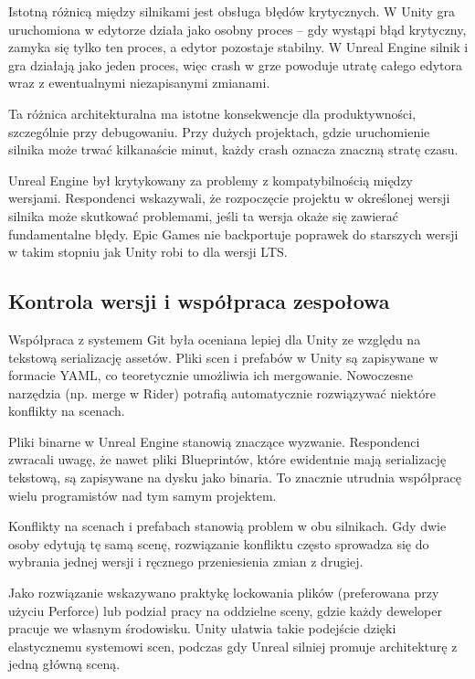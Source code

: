 Istotną różnicą między silnikami jest obsługa błędów krytycznych. W Unity gra uruchomiona w edytorze działa jako osobny proces -- gdy wystąpi błąd krytyczny, zamyka się tylko ten proces, a edytor pozostaje stabilny. W Unreal Engine silnik i gra działają jako jeden proces, więc crash w grze powoduje utratę całego edytora wraz z ewentualnymi niezapisanymi zmianami.

Ta różnica architekturalna ma istotne konsekwencje dla produktywności,
szczególnie przy debugowaniu. Przy dużych projektach, gdzie uruchomienie
silnika może trwać kilkanaście minut, każdy crash oznacza znaczną stratę czasu.


Unreal Engine był krytykowany za problemy z kompatybilnością między wersjami. Respondenci wskazywali, że rozpoczęcie projektu w określonej wersji silnika może skutkować problemami, jeśli ta wersja okaże się zawierać fundamentalne błędy. Epic Games nie backportuje poprawek do starszych wersji w takim stopniu jak Unity robi to dla wersji LTS.

\subsection{Kontrola wersji i współpraca zespołowa}
\label{subsec:kontrola-wersji}


Współpraca z systemem Git była oceniana lepiej dla Unity ze względu na tekstową serializację assetów. Pliki scen i prefabów w Unity są zapisywane w formacie YAML, co teoretycznie umożliwia ich mergowanie. Nowoczesne narzędzia (np. merge w Rider) potrafią automatycznie rozwiązywać niektóre konflikty na scenach.

Pliki binarne w Unreal Engine stanowią znaczące wyzwanie. Respondenci
zwracali uwagę, że nawet pliki Blueprintów, które ewidentnie mają serializację
tekstową, są zapisywane na dysku jako binaria. To znacznie utrudnia współpracę wielu programistów nad tym samym projektem.


Konflikty na scenach i prefabach stanowią problem w obu silnikach. Gdy dwie osoby edytują tę samą scenę, rozwiązanie konfliktu często sprowadza się do wybrania jednej wersji i ręcznego przeniesienia zmian z drugiej.

Jako rozwiązanie wskazywano praktykę lockowania plików (preferowana przy użyciu Perforce) lub podział pracy na oddzielne sceny, gdzie każdy deweloper pracuje we własnym środowisku. Unity ułatwia takie podejście dzięki elastycznemu systemowi scen, podczas gdy Unreal silniej promuje architekturę z jedną główną sceną.

